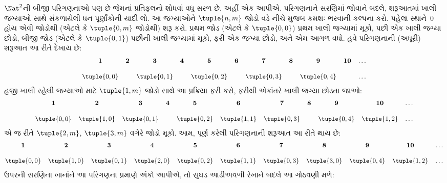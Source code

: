 \documentclass[../../../include/open-logic-section]{subfiles}
\begin{document}


\begin{explain}
$\Nat^2$ની બીજી પરિગણનાઓ પણ છે જેમનાં પ્રતિફલનો
શોધવાં વધુ સરળ છે. અહીં એક આપીએ.
પરિગણનાને સરણિમાં જોવાને બદલે, શરૂઆતમાં ખાલી
જગ્યાઓ સાથે સંકળાયેલી ધન પૂર્ણાંકોની યાદી લો.
આ જગ્યાઓને $\tuple{n,m}$ જોડો વડે નીચે મુજબ
ક્રમશઃ ભરવાની કલ્પના કરો. પહેલા સ્થાને~$0$ હોય
એવી જોડોથી (એટલે કે $\tuple{0,m}$ જોડોથી) શરૂ કરો.
પ્રથમ જોડ (એટલે કે $\tuple{0,0}$) પ્રથમ ખાલી
જગ્યામાં મૂકો, પછી એક ખાલી જગ્યા છોડો, બીજી જોડ
(એટલે કે $\tuple{0,1}$) પછીની ખાલી જગ્યામાં મૂકો,
ફરી એક જગ્યા છોડો, અને એમ આગળ વધો.
હવે પરિગણનાની (અધૂરી) શરૂઆત આ રીતે દેખાય છે:
\[\small
\begin{array}{@{}c c c c c c c c c c c@{}}
\mathbf 1 & \mathbf 2 & \mathbf 3 & \mathbf 4 & \mathbf 5 & \mathbf 6 & \mathbf 7 & \mathbf 8 & \mathbf 9 & \mathbf{10} & \dots \\ \\
\tuple{0,0} &  & \tuple{0,1} &  & \tuple{0,2} &  & \tuple{0,3} & & \tuple{0,4} &  & \dots \\
\end{array}
\]
હજી ખાલી રહેલી જગ્યાઓ માટે $\tuple{1,m}$ જોડો
સાથે આ પ્રક્રિયા ફરી કરો, ફરીથી એકાંતરે ખાલી
જગ્યા છોડતા જાઓ:
\[\small
\begin{array}{@{}c c c c c c c c c c c@{}}
\mathbf 1 & \mathbf 2 & \mathbf 3 & \mathbf 4 & \mathbf 5 & \mathbf 6 & \mathbf 7 & \mathbf 8 & \mathbf 9 & \mathbf{10} & \dots \\ \\
\tuple{0,0} & \tuple{1,0} & \tuple{0,1} &  & \tuple{0,2} & \tuple{1,1} &
\tuple{0,3} & & \tuple{0,4} &  \tuple{1,2} & \dots \\
\end{array}
\]
એ જ રીતે $\tuple{2,m}$, $\tuple{3,m}$ વગેરે
જોડો મૂકો. આમ, પૂર્ણ કરેલી પરિગણનાની શરૂઆત
આ રીતે થાય છે:
\[\small
\begin{array}{@{}cc c c c c c c c c c@{}}
\mathbf 1 & \mathbf 2 & \mathbf 3 & \mathbf 4 & \mathbf 5 & \mathbf 6 & \mathbf 7 & \mathbf 8 & \mathbf 9 & \mathbf{10} & \dots \\ \\
\tuple{0,0} & \tuple{1,0} & \tuple{0,1} & \tuple{2,0}  & \tuple{0,2} &
\tuple{1,1} & \tuple{0,3} & \tuple{3,0}  & \tuple{0,4} &  \tuple{1,2} & \dots \\
\end{array}
\]
ઉપરની સરણિના ખાનાંને આ પરિગણના પ્રમાણે અંકો
આપીએ, તો સુઘડ આડીઅવળી રેખાને બદલે આ ગોઠવણી મળે:

\end{explain}
\end{document}
